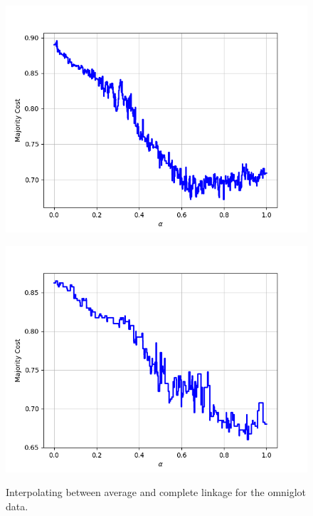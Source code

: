 \begin{figure}[H]
\begin{minipage}{.24\textwidth}
  {\includegraphics[width=\linewidth]{plots/omniglot-intra-ac/Tagalog}}
\end{minipage}
\begin{minipage}{.24\textwidth}
  \centering
  {\includegraphics[width=\linewidth]{plots/omniglot-intra-ac/Tifinagh}}
\end{minipage}
\caption{%
  Interpolating between average and complete linkage for the omniglot data.}
\label{}
\end{figure}

